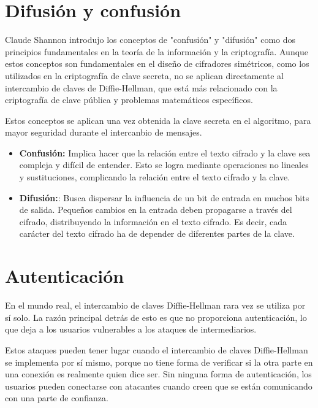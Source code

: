 \documentclass[11pt]{article}
\begin{document}
\section{Difusión y confusión}

Claude Shannon introdujo los conceptos de "confusión" y "difusión" como dos principios fundamentales en la teoría de la información y la criptografía. Aunque estos conceptos son fundamentales en el diseño de cifradores simétricos, como los utilizados en la criptografía de clave secreta, no se aplican directamente al intercambio de claves de Diffie-Hellman, que está más relacionado con la criptografía de clave pública y problemas matemáticos específicos.

Estos conceptos se aplican una vez obtenida la clave secreta en el algoritmo, para mayor seguridad durante el intercanbio de mensajes.

\begin{itemize}
	\item \textbf{Confusión:} Implica hacer que la relación entre el texto cifrado y la clave sea compleja y difícil de entender. Esto se logra mediante operaciones no lineales y sustituciones, complicando la relación entre el texto cifrado y la clave.

	\item \textbf{Difusión:}: Busca dispersar la influencia de un bit de entrada en muchos bits de salida. Pequeños cambios en la entrada deben propagarse a través del cifrado, distribuyendo la información en el texto cifrado. Es decir, cada carácter del texto cifrado ha de depender de diferentes partes de la clave.
\end{itemize}

\section{Autenticación}

En el mundo real, el intercambio de claves Diffie-Hellman rara vez se utiliza por sí solo. La razón principal detrás de esto es que no proporciona autenticación, lo que deja a los usuarios vulnerables a los ataques de intermediarios.

Estos ataques pueden tener lugar cuando el intercambio de claves Diffie-Hellman se implementa por sí mismo, porque no tiene forma de verificar si la otra parte en una conexión es realmente quien dice ser. Sin ninguna forma de autenticación, los usuarios pueden conectarse con atacantes cuando creen que se están comunicando con una parte de confianza.
\end{document}
